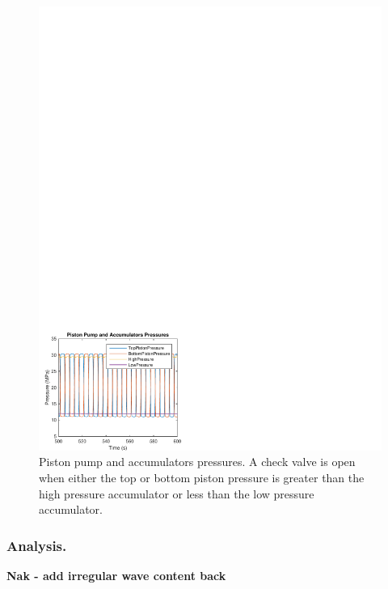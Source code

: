 \documentclass[twocolumn,10pt]{asme2e}
\begin{document}
\begin{figure}[t]
    \centering
    \includegraphics[width=1\columnwidth]{Images/Pressures}
    \caption{Piston pump and accumulators pressures. A check valve is open when either the top or bottom piston pressure is greater than the high pressure accumulator or less than the low pressure accumulator.}
    \label{HydPr}
    \end{figure}

\subsubsection*{Analysis.}    \textbf{Nak - add irregular wave content back}


%   
 
\end{document}
